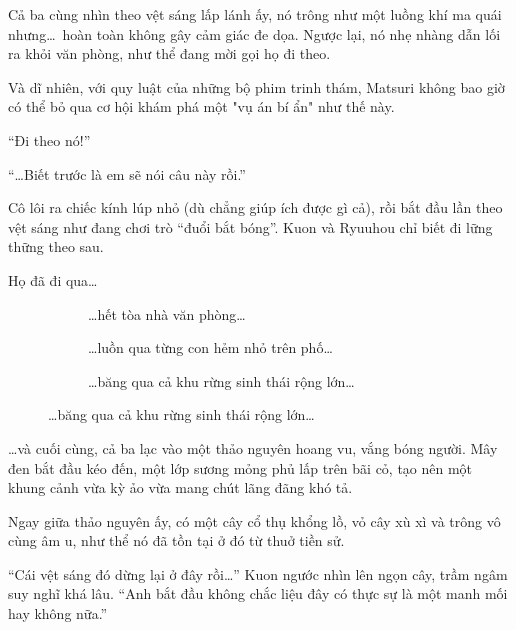 \documentclass[../main.tex]{subfiles}
\begin{document}

Cả ba cùng nhìn theo vệt sáng lấp lánh ấy, nó trông như một luồng khí ma quái nhưng\dots\ hoàn toàn không gây cảm giác đe dọa. Ngược lại, nó nhẹ nhàng dẫn lối ra khỏi văn phòng, như thể đang mời gọi họ đi theo.

Và dĩ nhiên, với quy luật của những bộ phim trinh thám, Matsuri không bao giờ có thể bỏ qua cơ hội khám phá một "vụ án bí ẩn" như thế này.

``Đi theo nó!''

``\dots Biết trước là em sẽ nói câu này rồi.''

Cô lôi ra chiếc kính lúp nhỏ (dù chẳng giúp ích được gì cả), rồi bắt đầu lần theo vệt sáng như đang chơi trò ``đuổi bắt bóng''. Kuon và Ryuuhou chỉ biết đi lững thững theo sau.

Họ đã đi qua\dots

\begin{figure}[H]
  \centering
  \begin{subfigure}[t]{0.45\textwidth}
    \centering
    \caption{\dots hết tòa nhà văn phòng\dots}
  \end{subfigure}
  \quad
  \begin{subfigure}[t]{0.45\textwidth}
    \centering
    \caption{\dots luồn qua từng con hẻm nhỏ trên phố\dots}
  \end{subfigure}
  \quad
  \begin{subfigure}[t]{0.45\textwidth}
    \centering
    \caption{\dots băng qua cả khu rừng sinh thái rộng lớn\dots}
  \end{subfigure}
\end{figure}

\dots và cuối cùng, cả ba lạc vào một thảo nguyên hoang vu, vắng bóng người. Mây đen bắt đầu kéo đến, một lớp sương mỏng phủ lấp trên bãi cỏ, tạo nên một khung cảnh vừa kỳ ảo vừa mang chút lãng đãng khó tả.

Ngay giữa thảo nguyên ấy, có một cây cổ thụ khổng lồ, vỏ cây xù xì và trông vô cùng âm u, như thể nó đã tồn tại ở đó từ thuở tiền sử.


``Cái vệt sáng đó dừng lại ở đây rồi\dots'' Kuon ngước nhìn lên ngọn cây, trầm ngâm suy nghĩ khá lâu. ``Anh bắt đầu không chắc liệu đây có thực sự là một manh mối hay không nữa.''
\end{document}
